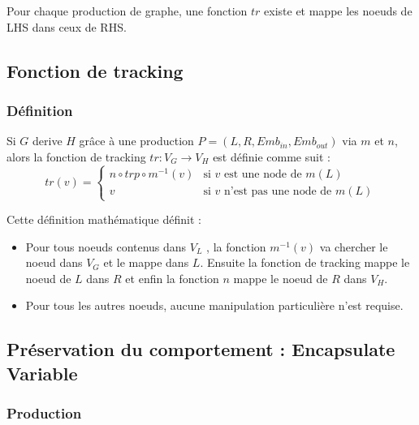 \documentclass[a4paper, 12pt]{article}
\begin{document}
  Pour chaque production de graphe, une fonction $tr$ existe et mappe les noeuds de LHS dans ceux de RHS.

  \subsection{Fonction de tracking}

  \subsubsection{Définition}
  Si \(G\) derive \(H\) grâce à une production \( P = (L,R,Emb_{in} ,Emb_{out} ) \) via $m$ et $n$, alors la fonction de tracking $tr : {V_G} \rightarrow {V_H} $ est définie comme suit :
  \[ tr(v) =
  \begin{cases}
    n \circ trp \circ m^{-1}(v) & \text{si }v\text{ est une node de }m(L)\\
    v & \text{si }v\text{ n'est pas une node de }m(L)
  \end{cases}
  \]

  Cette définition mathématique définit :
  \begin{itemize}[label=\textbullet]
    \item Pour tous noeuds contenus dans \( {V_L} \) , la fonction \(m^{-1}(v)\) va chercher le noeud dans {$V_G$} et le mappe dans \( L \). Ensuite la fonction de tracking mappe le noeud de  \( L \)
    dans  $R$  et enfin la fonction \( n \) mappe le noeud de  \( R \)  dans {$V_H$}.
    \item Pour tous les autres noeuds, aucune manipulation particulière n'est requise.
  \end{itemize}

  \subsection{Préservation du comportement : Encapsulate Variable}

  \subsubsection{Production}
\end{document}
